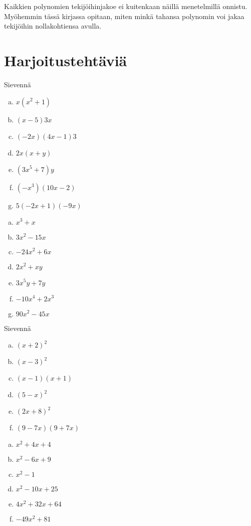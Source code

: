 Kaikkien polynomien tekijöihinjakoe ei kuitenkaan näillä menetelmillä onnistu.
Myöhemmin tässä kirjassa opitaan, miten minkä tahansa polynomin voi jakaa tekijöihin nollakohtiensa avulla.

\section{Harjoitustehtäviä}

\begin{tehtava}
    Sievennä
    \begin{enumerate}[a)]
        \item $x(x^2 + 1)$
        \item $(x - 5)3x$
        \item $(-2x)(4x - 1)3$
        \item $2x(x + y)$
        \item $(3x^5 + 7)y$
        \item $(-x^3)(10x - 2)$
        \item $5(-2x + 1)(-9x) $
    \end{enumerate}
    \begin{vastaus}
        \begin{enumerate}[a)]
            \item $x^3 + x$
            \item $3x^2 - 15x$
            \item $-24x^2 + 6x$
            \item $2x^2 + xy$
            \item $3x^5y + 7y$
            \item $-10x^4 + 2x^3$
            \item $90x^2 - 45x$
        \end{enumerate}
    \end{vastaus}
\end{tehtava}

\begin{tehtava}
    Sievennä
    \begin{enumerate}[a)]
        \item $(x+2)^2$
        \item $(x-3)^2$
        \item $(x-1)(x+1)$
        \item $(5-x)^2$
        \item $(2x + 8)^2$
        \item $(9 - 7x)(9 + 7x)$
    \end{enumerate}
    \begin{vastaus}
        \begin{enumerate}[a)]
            \item $x^2 + 4x + 4$
            \item $x^2 - 6x + 9$
            \item $x^2 - 1$
            \item $x^2 - 10x + 25$
            \item $4x^2 + 32x + 64$
            \item $-49x^2 + 81$
        \end{enumerate}
    \end{vastaus}
\end{tehtava}

